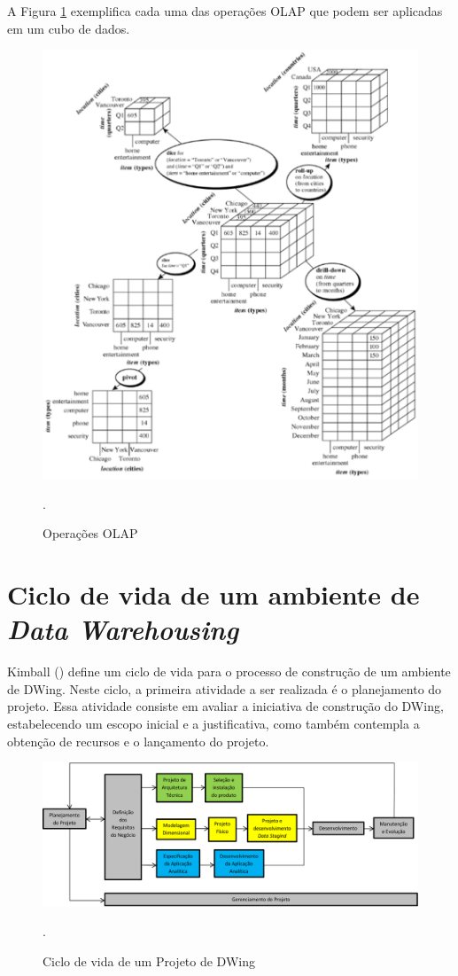 %

A Figura \ref{dw-olap} exemplifica cada uma das operações OLAP que podem ser aplicadas em um cubo de dados.
%
 \begin{figure}[!htb]
 	\centering
 		\includegraphics[scale=1]{figuras/olap}
 		\caption{Operações OLAP}.
 		\label{dw-olap}
 \end{figure}

\section{Ciclo de vida de um ambiente de \emph{Data Warehousing}}
\label{sec-lifecycleDw}
%

Kimball (\citeyear{kimball2002}) define um ciclo de vida para o processo de construção de um ambiente de DWing. Neste ciclo, a primeira atividade a ser realizada é o planejamento do projeto. Essa atividade consiste em avaliar a iniciativa de construção do DWing, estabelecendo um escopo inicial e a justificativa, como também contempla a obtenção  de recursos e o lançamento do projeto.

 \begin{figure}[!htb]
 	\centering
 		\includegraphics[scale=0.7]{figuras/dw-ciclo-de-vida}
 		\caption{Ciclo de vida de um Projeto de DWing \cite{kimball2002}}.
 		\label{dw-lifecycle}
 \end{figure}
%
%

